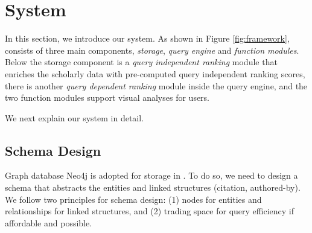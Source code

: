 \section{\oursystem System}
\label{sec-system}

In this section, we introduce our \oursystem system.
As shown in Figure \ref{fig:framework}, \oursystem consists of three main components, \ie \emph{storage}, \emph{query engine} and {\em function modules}.
Below the storage component is a {\em query independent ranking} module that enriches the scholarly data with pre-computed query independent ranking scores,  there is another {\em query dependent ranking} module inside the query engine, and the two function modules support visual analyses for users.



We next explain our system in detail.





\subsection{Schema Design} \label{subsec:schema}

Graph database Neo4j is adopted for storage in \oursystem. To do so, we need to design a schema that abstracts the entities and linked structures (\eg citation, authored-by).
We follow two principles for schema design: (1) nodes for entities and relationships for linked structures, and (2) trading space for query efficiency if affordable and possible.


